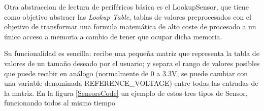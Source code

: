 \documentclass{report}
\begin{document}
\par \vspace{0.3cm}
Otra abstraccion de lectura de periféricos básica es el LookupSensor, que tiene como objetivo abstraer las \textit{Lookup Table}, tablas de valores preprocesados con el objetivo de transformar una formula matemática de alto coste de procesado a un único acceso a memoria a cambio de tener que ocupar dicha memoria. \par
Su funcionalidad es sencilla: recibe una pequeña matriz que representa la tabla de valores de un tamaño deseado por el usuario; y separa el rango de valores posibles que puede recibir en análogo (normalmente de 0 a 3.3V, se puede cambiar con una variable denominada REFERENCE\_VOLTAGE) entre todas las entradas de la matriz. En la figura \ref{SensorsCode} un ejemplo de estos tres tipos de Sensor, funcionando todos al mismo tiempo
\end{document}
